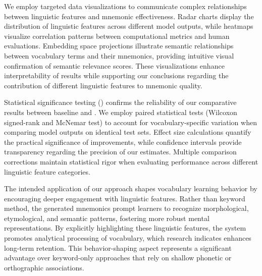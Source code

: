  We employ targeted data visualizations to communicate complex relationships between linguistic features and mnemonic effectiveness. Radar charts display the distribution of linguistic features across different model outputs, while heatmaps visualize correlation patterns between computational metrics and human evaluations. Embedding space projections illustrate semantic relationships between vocabulary terms and their mnemonics, providing intuitive visual confirmation of semantic relevance scores. These visualizations enhance interpretability of results while supporting our conclusions regarding the contribution of different linguistic features to mnemonic quality.

 Statistical significance testing () confirms the reliability of our comparative results between baseline and \linksys. We employ paired statistical tests (Wilcoxon signed-rank and McNemar test) to account for vocabulary-specific variation when comparing model outputs on identical test sets. Effect size calculations quantify the practical significance of improvements, while confidence intervals provide transparency regarding the precision of our estimates. Multiple comparison corrections maintain statistical rigor when evaluating performance across different linguistic feature categories.

 The intended application of our approach shapes vocabulary learning behavior by encouraging deeper engagement with linguistic features. Rather than keyword method, the generated mnemonics prompt learners to recognize morphological, etymological, and semantic patterns, fostering more robust mental representations. By explicitly highlighting these linguistic features, the system promotes analytical processing of vocabulary, which research indicates enhances long-term retention. This behavior-shaping aspect represents a significant advantage over keyword-only approaches that rely on shallow phonetic or orthographic associations.

